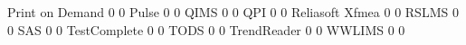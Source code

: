 \documentclass{article}
\begin{document}
\begin{Schunk}
\begin{Soutput}
  Print on Demand                                         0                  0
  Pulse                                                   0                  0
  QIMS                                                    0                  0
  QPI                                                     0                  0
  Reliasoft Xfmea                                         0                  0
  RSLMS                                                   0                  0
  SAS                                                     0                  0
  TestComplete                                            0                  0
  TODS                                                    0                  0
  TrendReader                                             0                  0
  WWLIMS                                                  0                  0
                                          

\end{Soutput}
\end{Schunk}
\end{document}
